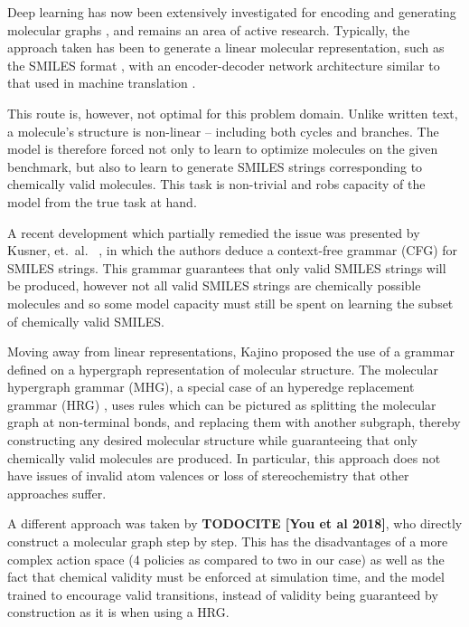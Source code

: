 \documentclass{article}
\newcommand{\CITE}[1]{{\bf TODOCITE [#1]}}
\begin{document}
Deep learning has now been extensively investigated for encoding and generating molecular graphs \cite{duvenaud2015, kearnes2016, gilmer2017, dai2018, jin2018, simonovsky2018, kusner2017, gomezbombarelli2016, guimaraes2017, pogany2019}, and remains an area of active research. Typically, the approach taken has been to generate a linear molecular representation, such as the SMILES format \cite{weininger1988}, with an encoder-decoder network architecture similar to that used in machine translation \cite{gomezbombarelli2016}.

This route is, however, not optimal for this problem domain. Unlike written text, a molecule's structure is non-linear -- including both cycles and branches. The model is therefore forced not only to learn to optimize molecules on the given benchmark, but also to learn to generate SMILES strings corresponding to chemically valid molecules. This task is non-trivial and robs capacity of the model from the true task at hand.

A recent development which partially remedied the issue was presented by Kusner, et.~al.~ \cite{kusner2017}, in which the authors deduce a context-free grammar (CFG) for SMILES strings. This grammar guarantees that only valid SMILES strings will be produced, however not all valid SMILES strings are chemically possible molecules and so some model capacity must still be spent on learning the subset of chemically valid SMILES.

Moving away from linear representations, Kajino \cite{kajino2018} proposed the use of a grammar defined on a hypergraph representation of molecular structure. The molecular hypergraph grammar (MHG), a special case of an hyperedge replacement grammar (HRG) \cite{drewes1997}, uses rules which can be pictured as splitting the molecular graph at non-terminal bonds, and replacing them with another subgraph, thereby constructing any desired molecular structure while guaranteeing that only chemically valid molecules are produced. In particular, this approach does not have issues of invalid atom valences or loss of stereochemistry that other approaches suffer.

A different approach was taken by \CITE{You et al 2018}, who directly construct a molecular graph step by step. This has the disadvantages of a more complex action space (4 policies as compared to two in our case) as well as the fact that chemical validity must be enforced at simulation time, and the model trained to encourage valid transitions, instead of validity being guaranteed by construction as it is when using a HRG.
\end{document}
